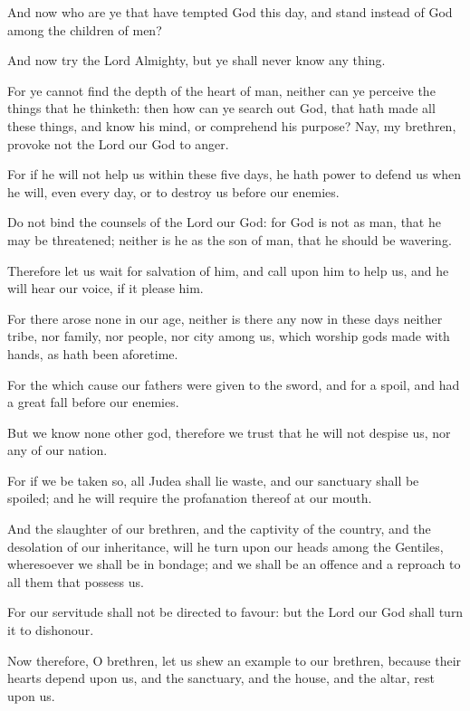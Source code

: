 {\par }{\PP {}And now who are ye that have tempted God this day, and stand instead of God among the children of men?
\par }{\PP {}And now try the Lord Almighty, but ye shall never know any thing.
\par }{\PP {}For ye cannot find the depth of the heart of man, neither can ye perceive the things that he thinketh: then how can ye search out God, that hath made all these things, and know his mind, or comprehend his purpose? Nay, my brethren, provoke not the Lord our God to anger.
\par }{\PP {}For if he will not help us within these five days, he hath power to defend us when he will, even every day, or to destroy us before our enemies.
\par }{\PP {}Do not bind the counsels of the Lord our God: for God is not as man, that he may be threatened; neither is he as the son of man, that he should be wavering.
\par }{\PP {}Therefore let us wait for salvation of him, and call upon him to help us, and he will hear our voice, if it please him.
\par }{\PP {}For there arose none in our age, neither is there any now in these days neither tribe, nor family, nor people, nor city among us, which worship gods made with hands, as hath been aforetime.
\par }{\PP {}For the which cause our fathers were given to the sword, and for a spoil, and had a great fall before our enemies.
\par }{\PP {}But we know none other god, therefore we trust that he will not despise us, nor any of our nation.
\par }{\PP {}For if we be taken so, all Judea shall lie waste, and our sanctuary shall be spoiled; and he will require the profanation thereof at our mouth.
\par }{\PP {}And the slaughter of our brethren, and the captivity of the country, and the desolation of our inheritance, will he turn upon our heads among the Gentiles, wheresoever we shall be in bondage; and we shall be an offence and a reproach to all them that possess us.
\par }{\PP {}For our servitude shall not be directed to favour: but the Lord our God shall turn it to dishonour.
\par }{\PP {}Now therefore, O brethren, let us shew an example to our brethren, because their hearts depend upon us, and the sanctuary, and the house, and the altar, rest upon us.
}
